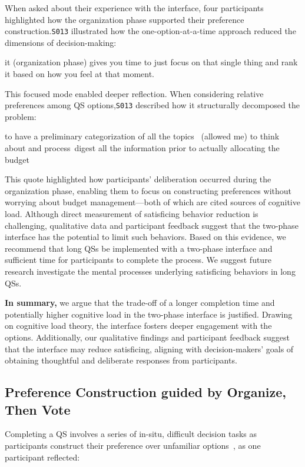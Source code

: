 When asked about their experience with the interface, four participants highlighted how the organization phase supported their preference construction.\texttt{S013} illustrated how the one-option-at-a-time approach reduced the dimensions of decision-making:

\begin{displayquote}  
\bracketellipsis it (organization phase) gives you time to just focus on that single thing and rank it based on how you feel at that moment. \hfill{}  
\end{displayquote}  

This focused mode enabled deeper reflection. When considering relative preferences among QS options,\texttt{S013} described how it structurally decomposed the problem:

\begin{displayquote}  
\bracketellipsis to have a preliminary categorization of all the topics ~\bracketellipsis (allowed me) to think about and process~\bracketellipsis digest all the information prior to actually allocating the budget~\bracketellipsis \hfill{}  
\end{displayquote}  

This quote highlighted how participants' deliberation occurred during the organization phase, enabling them to focus on constructing preferences without worrying about budget management—both of which are cited sources of cognitive load. Although direct measurement of satisficing behavior reduction is challenging, qualitative data and participant feedback suggest that the two-phase interface has the potential to limit such behaviors. Based on this evidence, we recommend that long QSs be implemented with a two-phase interface and sufficient time for participants to complete the process. We suggest future research investigate the mental processes underlying satisficing behaviors in long QSs. 

\textbf{In summary,} we argue that the trade-off of a longer completion time and potentially higher cognitive load in the two-phase interface is justified. Drawing on cognitive load theory, the interface fosters deeper engagement with the options. Additionally, our qualitative findings and participant feedback suggest that the interface may reduce satisficing, aligning with decision-makers' goals of obtaining thoughtful and deliberate responses from participants.

\subsection{Preference Construction guided by Organize, Then Vote}
Completing a QS involves a series of in-situ, difficult decision tasks as participants construct their preference over unfamiliar options~\cite{lichtensteinConstructionPreference2006}, as one participant reflected:

